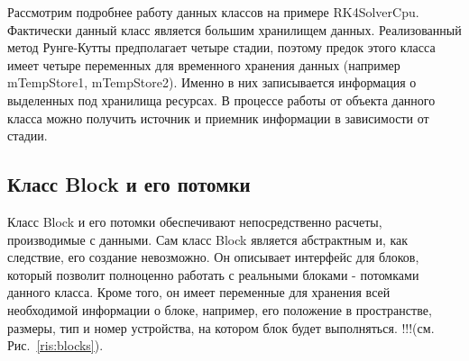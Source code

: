 \documentclass[a4paper, 14pt]{article}
\theoremstyle{definition}
\begin{document}
\par Рассмотрим подробнее работу данных классов на примере RK4SolverCpu. Фактически данный класс является большим хранилищем данных. Реализованный метод Рунге-Кутты предполагает четыре стадии, поэтому предок этого класса имеет четыре переменных для временного хранения данных (например mTempStore1, mTempStore2). Именно в них записывается информация о выделенных под хранилища ресурсах. В процессе работы от объекта данного класса можно получить источник и приемник информации в зависимости от стадии.

\newpage
\subsection{Класс Block и его потомки}

\par Класс Block и его потомки обеспечивают непосредственно расчеты, производимые с данными. Сам класс Block является абстрактным и, как следствие, его создание невозможно. Он описывает интерфейс для блоков, который позволит полноценно работать с реальными блоками - потомками данного класса. Кроме того, он имеет переменные для хранения всей необходимой информации о блоке, например, его положение в пространстве, размеры, тип и номер устройства, на котором блок будет выполняться. !!!(см. Рис.~\ref{ris:blocks}).
\end{document}
